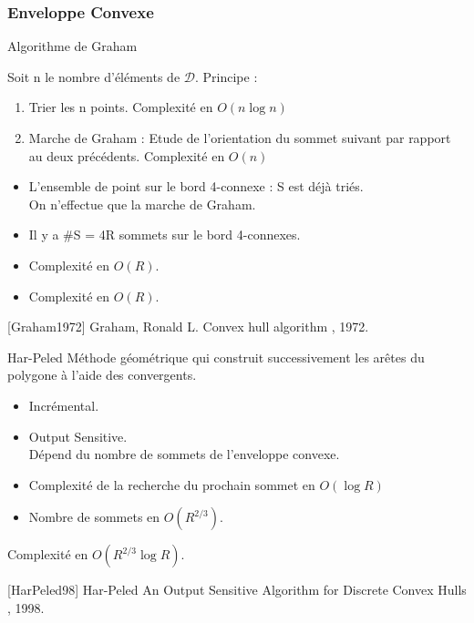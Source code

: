\begin{frame}
\frametitle{Enveloppe Convexe}
\begin{block}{Algorithme de Graham}
  {
  Soit n le nombre d'éléments de $\mathcal{D}$.
  Principe :
  \begin{enumerate}
    \item Trier les n points. Complexité en $O(n \log n)$
    \item Marche de Graham : Etude de l'orientation du sommet suivant par rapport au deux précédents. Complexité en $O(n)$
  \end{enumerate}

  \begin{itemize}
    \item L'ensemble de point sur le bord 4-connexe : S est déjà triés.\\
    On n'effectue que la marche de Graham.
    \item Il y a \#S = 4R sommets sur le bord 4-connexes.
    \item Complexité en $O(R)$.
  \end{itemize}
  
 }
  {
  \begin{itemize}
    \item Complexité en $O(R)$.
  \end{itemize}
 }  
\end{block}

{
  \scriptsize
  \begin{thebibliography}{alpha}
    [Graham1972] Graham, Ronald L.
    \newblock Convex hull algorithm
    , 1972. 
  \end{thebibliography}
}
{
  \begin{block}{Har-Peled}  
    Méthode géométrique qui construit successivement les arêtes du polygone à l’aide des convergents.
    \begin{itemize}
      \item Incrémental.
      \item Output Sensitive.\\
      Dépend du nombre de sommets de l’enveloppe convexe.
    \end{itemize}  

    \begin{itemize}
      \item Complexité de la recherche du prochain sommet en $O(\log R)$
      \item Nombre de sommets en $O(R^{2/3})$. 
    \end{itemize}
    Complexité en $O(R^{2/3} \log R)$.
  \end{block}

  \scriptsize
  \begin{thebibliography}{alpha}
    [HarPeled98] Har-Peled
    \newblock An Output Sensitive Algorithm for Discrete Convex Hulls
    , 1998.
    \end{thebibliography}
}
\end{frame}
